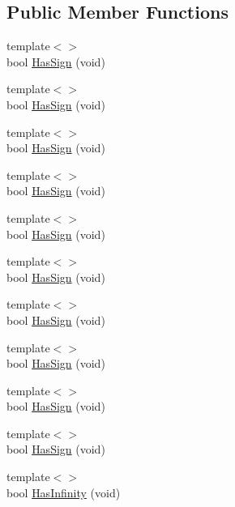 \subsection*{Public Member Functions}
\begin{DoxyCompactItemize}
\item 
{\footnotesize template$<$$>$ }\\bool \hyperlink{classcmn_type_traits_acb0f6eacbdf80dbcc5e8e758e0e24d0c}{Has\-Sign} (void)
\item 
{\footnotesize template$<$$>$ }\\bool \hyperlink{classcmn_type_traits_a9f118cdb6057e31437e0d6f107239e75}{Has\-Sign} (void)
\item 
{\footnotesize template$<$$>$ }\\bool \hyperlink{classcmn_type_traits_af4906116c12f1ab077791c6015ba1361}{Has\-Sign} (void)
\item 
{\footnotesize template$<$$>$ }\\bool \hyperlink{classcmn_type_traits_ae18425f51cf45c3bb26d02c47dc507dc}{Has\-Sign} (void)
\item 
{\footnotesize template$<$$>$ }\\bool \hyperlink{classcmn_type_traits_a6af1de5401258a3ebd7c9e0582ee7c37}{Has\-Sign} (void)
\item 
{\footnotesize template$<$$>$ }\\bool \hyperlink{classcmn_type_traits_aa349bad32d0e716ca080558cc0bc86f0}{Has\-Sign} (void)
\item 
{\footnotesize template$<$$>$ }\\bool \hyperlink{classcmn_type_traits_ab3d1a289efe069c6f851253b941af2b5}{Has\-Sign} (void)
\item 
{\footnotesize template$<$$>$ }\\bool \hyperlink{classcmn_type_traits_a4afa313fd9222ccccfc624ed48fb70be}{Has\-Sign} (void)
\item 
{\footnotesize template$<$$>$ }\\bool \hyperlink{classcmn_type_traits_a0c475b5070e31bc03dcd571ac5e4f128}{Has\-Sign} (void)
\item 
{\footnotesize template$<$$>$ }\\bool \hyperlink{classcmn_type_traits_adcbbecea70ccde45a77b97dc226b3c73}{Has\-Sign} (void)
\item 
{\footnotesize template$<$$>$ }\\bool \hyperlink{classcmn_type_traits_ad8c4afdf017e81fd8f05cb66164c74af}{Has\-Infinity} (void)
\item 

\end{DoxyCompactItemize}

